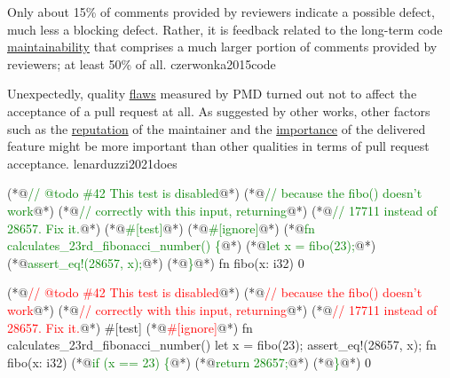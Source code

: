 \documentclass{article}
\begin{document}

  {Only about 15\% of comments provided by reviewers indicate a possible defect, much less a blocking defect. Rather, it is feedback related to the long-term code \ul{maintainability} that comprises a much larger portion of comments provided by reviewers; at least 50\% of all.}
  {czerwonka2015code}

  {Unexpectedly, quality \ul{flaws} measured by PMD turned out not to affect the acceptance of a pull request at all. As suggested by other works, other factors such as the \ul{reputation} of the maintainer and the \ul{importance} of the delivered feature might be more important than other qualities in terms of pull request acceptance.}
  {lenarduzzi2021does}


\begin{pptWide}{2}
{\scriptsize\begin{ffcode}
(*@\textcolor{green}{// @todo \#42 This test is disabled}@*)
(*@\textcolor{green}{//  because the fibo() doesn't work}@*)
(*@\textcolor{green}{//  correctly with this input, returning}@*)
(*@\textcolor{green}{//  17711 instead of 28657. Fix it.}@*)
(*@\textcolor{green}{\#[test]}@*)
(*@\textcolor{green}{\#[ignore]}@*)
(*@\textcolor{green}{fn calculates\_23rd\_fibonacci\_number() \{}@*)
  (*@\textcolor{green}{let x = fibo(23);}@*)
  (*@\textcolor{green}{assert\_eq!(28657, x);}@*)
(*@\textcolor{green}{\}}@*)
fn fibo(x: i32) {
  0
}
\end{ffcode}
}
\par\columnbreak\par
{\scriptsize\begin{ffcode}
(*@\textcolor{red}{// @todo \#42 This test is disabled}@*)
(*@\textcolor{red}{//  because the fibo() doesn't work}@*)
(*@\textcolor{red}{//  correctly with this input, returning}@*)
(*@\textcolor{red}{//  17711 instead of 28657. Fix it.}@*)
#[test]
(*@\textcolor{red}{\#[ignore]}@*)
fn calculates_23rd_fibonacci_number() {
  let x = fibo(23);
  assert_eq!(28657, x);
}
fn fibo(x: i32) {
  (*@\textcolor{green}{if (x == 23) \{}@*)
    (*@\textcolor{green}{return 28657;}@*)
  (*@\textcolor{green}{\}}@*)
  0
}
\end{ffcode}
}
\end{pptWide}
\plush{}
\end{document}
